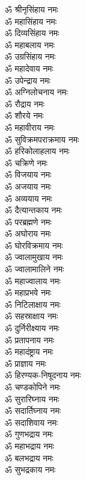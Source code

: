 \begin{multicols}{2}
\begin{flushleft}
ॐ श्रीनृसिंहाय नमः\\
ॐ महासिंहाय नमः\\
ॐ दिव्यसिंहाय नमः\\
ॐ महाबलाय नमः\\
ॐ उग्रसिंहाय नमः\\
ॐ महादेवाय नमः\\
ॐ उपेन्द्राय नमः\\
ॐ अग्निलोचनाय नमः\\
ॐ रौद्राय नमः\\
ॐ शौरये नमः\hfill{}\\
ॐ महावीराय नमः\\
ॐ सुविक्रमपराक्रमाय नमः\\
ॐ हरिकोलाहलाय नमः\\
ॐ चक्रिणे नमः\\
ॐ विजयाय नमः\\
ॐ अजयाय नमः\\
ॐ अव्ययाय नमः\\
ॐ दैत्यान्तकाय नमः\\
ॐ परब्रह्मणे नमः\\
ॐ अघोराय नमः\hfill{}\\
ॐ घोरविक्रमाय नमः\\
ॐ ज्वालामुखाय नमः\\
ॐ ज्वालामालिने नमः\\
ॐ महाज्वालाय नमः\\
ॐ महाप्रभवे नमः\\
ॐ निटिलाक्षाय नमः\\
ॐ सहस्राक्षाय नमः\\
ॐ दुर्निरीक्ष्याय नमः\\
ॐ प्रतापनाय नमः\\
ॐ महादंष्ट्राय नमः\hfill{}\\
ॐ प्राज्ञाय नमः\\
ॐ हिरण्यक-निषूदनाय नमः\\
ॐ चण्डकोपिने नमः\\
ॐ सुरारिघ्नाय नमः\\
ॐ सदार्तिघ्नाय नमः\\
ॐ सदाशिवाय नमः\\
ॐ गुणभद्राय नमः\\
ॐ महाभद्राय नमः\\
ॐ बलभद्राय नमः\\
ॐ सुभद्रकाय नमः\hfill{}\\

\end{flushleft}
\end{multicols}
